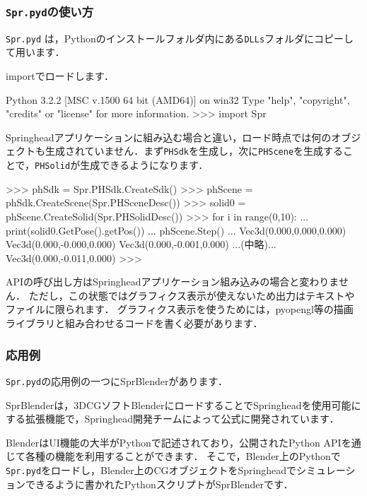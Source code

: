 \subsubsection*{\texttt{Spr.pyd}の使い方}

\texttt{Spr.pyd} は，Pythonのインストールフォルダ内にある\texttt{DLLs}フォルダにコピーして用います．

importでロードします．
\begin{sourcecode}
Python 3.2.2 [MSC v.1500 64 bit (AMD64)] on win32
Type "help", "copyright", "credits" or "license" for more information.
\KLUDGE >>> import Spr
\end{sourcecode}

Springheadアプリケーションに組み込む場合と違い，ロード時点では何のオブジェクトも生成されていません．まず\texttt{PHSdk}を生成し，次に\texttt{PHScene}を生成することで，\texttt{PHSolid}が生成できるようになります．
\begin{sourcecode}
\KLUDGE >>> phSdk = Spr.PHSdk.CreateSdk()
\KLUDGE >>> phScene = phSdk.CreateScene(Spr.PHSceneDesc())
\KLUDGE >>> solid0 = phScene.CreateSolid(Spr.PHSolidDesc())
\KLUDGE >>> for i in range(0,10):
...     print(solid0.GetPose().getPos())
...     phScene.Step()
... 
Vec3d(0.000,0.000,0.000)
Vec3d(0.000,-0.000,0.000)
Vec3d(0.000,-0.001,0.000)
...(中略)...
Vec3d(0.000,-0.011,0.000)
\KLUDGE >>>
\end{sourcecode}

APIの呼び出し方はSpringheadアプリケーション組み込みの場合と変わりません．
\KLUDGE ただし，この状態ではグラフィクス表示が使えないため出力はテキストやファイルに限られます．
\KLUDGE グラフィクス表示を使うためには，pyopengl等の描画ライブラリと組み合わせるコードを書く必要があります．


\subsubsection*{応用例}

\texttt{Spr.pyd}の応用例の一つにSprBlenderがあります．

\begin{center}
\end{center}

SprBlenderは，3DCGソフトBlenderにロードすることでSpringheadを使用可能にする拡張機能で，Springhead開発チームによって公式に開発されています．

BlenderはUI機能の大半がPythonで記述されており，公開されたPython APIを通じて各種の機能を利用することができます．
\KLUDGE そこで，Blender上のPythonで\texttt{Spr.pyd}をロードし，Blender上のCGオブジェクトをSpringheadでシミュレーションできるように書かれたPythonスクリプトがSprBlenderです．


